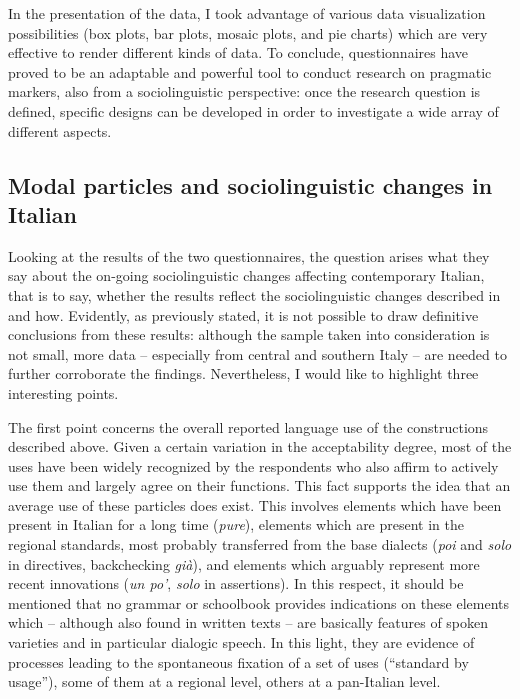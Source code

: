 In the presentation of the data, I took advantage of various data visualization possibilities (box plots, bar plots, mosaic plots, and pie charts) which are very effective to render different kinds of data. To conclude, questionnaires have proved to be an adaptable and powerful tool to conduct research on pragmatic markers, also from a sociolinguistic perspective: once the research question is defined, specific designs can be developed in order to investigate a wide array of different aspects.

\subsection{Modal particles and sociolinguistic changes in Italian}
\hypertarget{Toc124860691}{}
Looking at the results of the two questionnaires, the question arises what they say about the on-going sociolinguistic changes affecting contemporary Italian, that is to say, whether the results reflect the sociolinguistic changes described in  and how. Evidently, as previously stated, it is not possible to draw definitive conclusions from these results: although the sample taken into consideration is not small, more data – especially from central and southern Italy – are needed to further corroborate the findings. Nevertheless, I would like to highlight three interesting points.

The first point concerns the overall reported language use of the constructions described above. Given a certain variation in the acceptability degree, most of the uses have been widely recognized by the respondents who also affirm to actively use them and largely agree on their functions. This fact supports the idea that an average use of these particles does exist. This involves elements which have been present in Italian for a long time (\textit{pure}), elements which are present in the regional standards, most probably transferred from the base dialects (\textit{poi} and \textit{solo} in directives, backchecking \textit{già}), and elements which arguably represent more recent innovations (\textit{un po’}, \textit{solo} in assertions). In this respect, it should be mentioned that no grammar or schoolbook provides indications on these elements which – although also found in written texts – are basically features of spoken varieties and in particular dialogic speech. In this light, they are evidence of processes leading to the spontaneous fixation of a set of uses (“standard by usage”), some of them at a regional level, others at a pan-Italian level.

